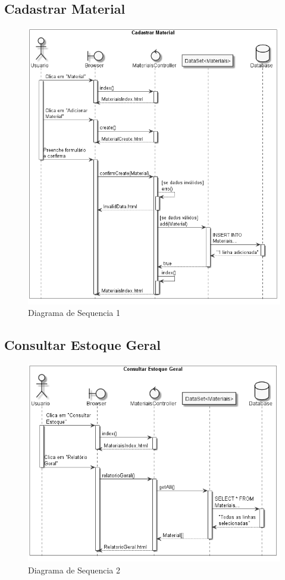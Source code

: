 \documentclass[rascunho,xindy,acronym,symbols]{fei}
\begin{document}
\subsection{Cadastrar Material}

\begin{figure}[H]
    \centering
    \includegraphics[scale=0.6, width=395pt]{./Images/DS_Cadastrar_Material.jpg}
    \caption{Diagrama de Sequencia 1}
    \label{fig:diag_seq1}
\end{figure}

\subsection{Consultar Estoque Geral}

\begin{figure}[H]
    \centering
    \includegraphics[width=\textwidth]{./Images/DS_Consultar_Estoque_Geral.jpg}
    \caption{Diagrama de Sequencia 2}
    \label{fig:diag_seq2}
\end{figure}
\end{document}
